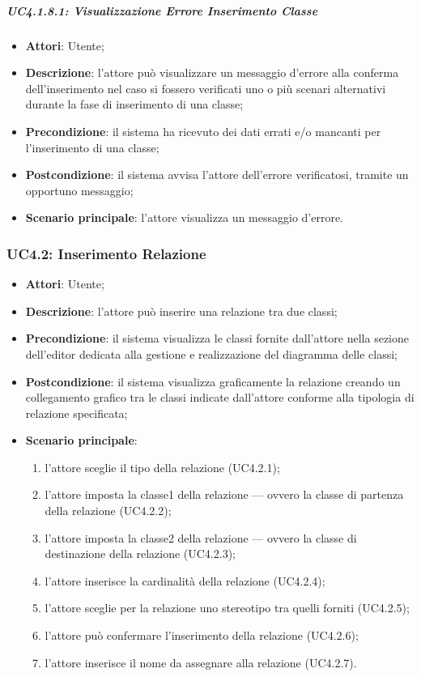 \begin{itemize}
\begin{itemize}
\begin{itemize}
\begin{itemize}
\subparagraph{UC4.1.8.1: Visualizzazione Errore Inserimento Classe}
\label{UC4.1.8.1}
\begin{itemize}
	\item \textbf{Attori}: Utente;
	\item \textbf{Descrizione}: l'attore può visualizzare un messaggio d'errore alla conferma dell'inserimento nel caso si fossero verificati uno o più scenari alternativi durante la fase di inserimento di una classe;
	\item \textbf{Precondizione}: il sistema ha ricevuto dei dati errati e/o mancanti per l'inserimento di una classe;
	\item \textbf{Postcondizione}: il sistema avvisa l'attore dell'errore verificatosi, tramite un opportuno messaggio;
	\item \textbf{Scenario principale}: l'attore visualizza un messaggio d'errore.
\end{itemize}

\subsubsection{UC4.2: Inserimento Relazione}
\label{UC4.2}
\begin{itemize}
	\item \textbf{Attori}: Utente;
	\item \textbf{Descrizione}: l'attore può inserire una relazione tra due classi;
	\item \textbf{Precondizione}: il sistema visualizza le classi fornite dall'attore nella sezione dell'editor dedicata alla gestione e realizzazione del diagramma delle classi;
	\item \textbf{Postcondizione}: il sistema visualizza graficamente la relazione creando un collegamento grafico tra le classi indicate dall'attore conforme alla tipologia di relazione specificata;
	\item \textbf{Scenario principale}:
	\begin{enumerate}
		\item l'attore sceglie il tipo della relazione (UC4.2.1);
		\item l'attore imposta la classe1 della relazione --- ovvero la classe di partenza della relazione (UC4.2.2);
		\item l'attore imposta la classe2 della relazione --- ovvero la classe di destinazione della relazione (UC4.2.3);
		\item l'attore inserisce la cardinalità della relazione (UC4.2.4);
		\item l'attore sceglie per la relazione uno stereotipo tra quelli forniti (UC4.2.5);
		\item l'attore può confermare l'inserimento della relazione (UC4.2.6);
		\item l'attore inserisce il nome da assegnare alla relazione (UC4.2.7).
	\end{enumerate}
\end{itemize}


\end{itemize}
\end{itemize}
\end{itemize}
\end{itemize}
